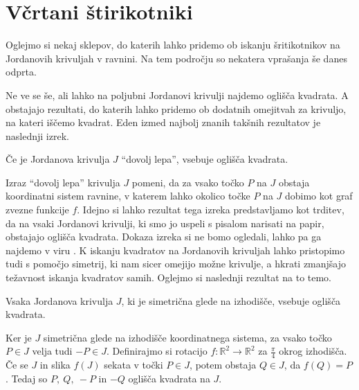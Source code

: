 \documentclass[mat1]{fmfdelo}
\newcommand{\R}{\mathbb R}
\begin{document}
\section{Včrtani štirikotniki}
Oglejmo si nekaj sklepov, do katerih lahko pridemo ob iskanju šritikotnikov na Jordanovih krivuljah v ravnini. Na tem področju so nekatera vprašanja še danes odprta. 

Ne ve se še, ali lahko na poljubni Jordanovi krivulji najdemo oglišča kvadrata. A obstajajo rezultati, do katerih lahko pridemo ob dodatnih omejitvah za krivuljo, na kateri iščemo kvadrat. Eden izmed najbolj znanih takšnih rezultatov je naslednji izrek.

\begin{izrek}
Če je Jordanova krivulja $J$ ``dovolj lepa'', vsebuje oglišča kvadrata.
\end{izrek}

Izraz ``dovolj lepa'' krivulja $J$ pomeni, da za vsako točko $P$ na $J$ obstaja koordinatni sistem ravnine, v katerem lahko okolico točke $P$ na $J$ dobimo kot graf zvezne funkcije $f$. Idejno si lahko rezultat tega izreka predstavljamo kot trditev, da na vsaki Jordanovi krivulji, ki smo jo uspeli s pisalom narisati na papir, obstajajo oglišča kvadrata. Dokaza izreka si ne bomo ogledali, lahko pa ga najdemo v viru \cite{izrek_stromquist}. K iskanju kvadratov na Jordanovih krivuljah lahko pristopimo tudi s pomočjo simetrij, ki nam sicer omejijo možne krivulje, a hkrati zmanjšajo težavnost iskanja kvadratov samih. Oglejmo si naslednji rezultat na to temo.

\begin{trditev}\label{trd:kvadrat}
Vsaka Jordanova krivulja $J$, ki je simetrična glede na izhodišče, vsebuje oglišča kvadrata.
\end{trditev}

\proof
Ker je $J$ simetrična glede na izhodišče koordinatnega sistema, za vsako točko $P \in J$ velja tudi $-P \in J$. Definirajmo si rotacijo $f \colon \R^2 \to \R^2$ za $\frac{\pi}{4}$ okrog izhodišča. Če se $J$ in slika $f(J)$ sekata v točki $P \in J$, potem obstaja $Q \in J$, da $f(Q) = P$. Tedaj so $P,~Q,~-P$ in $-Q$ oglišča kvadrata na $J$.

\begin{center}
\end{center}
\end{document}
